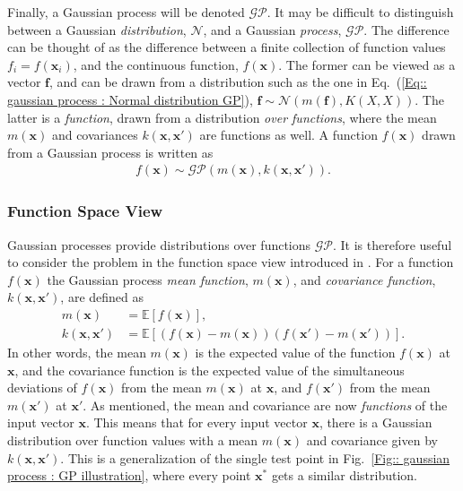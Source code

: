 \documentclass[twoside,english]{uiofysmaster}
\begin{document}
Finally, a Gaussian process will be denoted $\mathcal{GP}$. It may be difficult to distinguish between a Gaussian \textit{distribution}, $\mathcal{N}$, and a Gaussian \textit{process}, $\mathcal{GP}$. The difference can be thought of as the difference between a finite collection of function values $f_i = f(\textbf{x}_i)$, and the continuous function, $f(\textbf{x})$. The former can be viewed as a vector $\textbf{f}$, and can be drawn from a distribution such as the one in Eq.~(\ref{Eq:: gaussian process : Normal distribution GP}), $\textbf{f} \sim \mathcal{N}(m(\textbf{f} ), K(X, X))$. The latter is a \textit{function}, drawn from a distribution \textit{over functions}, where the mean $m(\textbf{x})$ and covariances $k(\textbf{x}, \textbf{x}')$ are functions as well. A function $f(\textbf{x})$ drawn from a Gaussian process is written as 
\begin{align}
f(\textbf{x}) \sim \mathcal{GP} (m(\textbf{x}), k(\textbf{x}, \textbf{x}')).
\end{align}

\subsubsection{Function Space View}

Gaussian processes provide distributions over functions $\mathcal{GP}$. It is therefore useful to consider the problem in the function space view introduced in \cite{rasmussen2006gaussian}. For a function $f(\textbf{x})$ the Gaussian process \textit{mean function}, $m(\textbf{x})$, and \textit{covariance function}, $k(\textbf{x}, \textbf{x}')$, are defined as
\begin{align}
m(\textbf{x}) &= \mathbb{E}[f(\textbf{x})],\\
k(\textbf{x}, \textbf{x}') &= \mathbb{E} [(f(\textbf{x}) - m(\textbf{x}))(f(\textbf{x}') - m(\textbf{x}'))].
\end{align}
In other words, the mean $m(\textbf{x})$ is the expected value of the function $f(\textbf{x})$ at $\textbf{x}$, and the covariance function is the expected value of the simultaneous deviations of $f(\textbf{x})$ from the mean $m(\textbf{x})$ at $\textbf{x}$, and $f(\textbf{x}')$ from the mean $m(\textbf{x}')$ at $\textbf{x}'$. As mentioned, the mean and covariance are now \textit{functions} of the input vector $\textbf{x}$. This means that for every input vector $\textbf{x}$, there is a Gaussian distribution over function values with a mean $m(\textbf{x})$ and covariance given by $k(\textbf{x}, \textbf{x}')$. This is a generalization of the single test point in Fig.~\ref{Fig:: gaussian process : GP illustration}, where every point $\textbf{x}^*$ gets a similar distribution.
\end{document}
